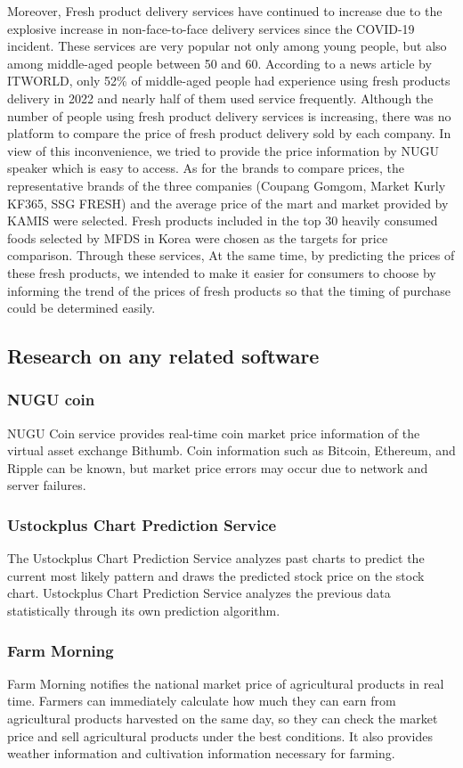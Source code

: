 \documentclass[conference]{IEEEtran}
\begin{document}
Moreover, Fresh product delivery services have continued to increase due to the explosive increase in non-face-to-face delivery services since the COVID-19 incident. These services are very popular not only among young people, but also among middle-aged people between 50 and 60. According to a news article by ITWORLD, only 52\% of middle-aged people had experience using fresh products delivery in 2022 and nearly half of them used service frequently. Although the number of people using fresh product delivery services is increasing, there was no platform to compare the price of fresh product delivery sold by each company. In view of this inconvenience, we tried to provide the price information by NUGU speaker which is easy to access. As for the brands to compare prices, the representative brands of the three companies (Coupang Gomgom, Market Kurly KF365, SSG FRESH) and the average price of the mart and market provided by KAMIS were selected. Fresh products included in the top 30 heavily consumed foods selected by MFDS in Korea were chosen as the targets for price comparison. Through these services, At the same time, by predicting the prices of these fresh products, we intended to make it easier for consumers to choose by informing the trend of the prices of fresh products so that the timing of purchase could be determined easily.




\subsection{Research on any related software}
\subsubsection{NUGU coin}

NUGU Coin service provides real-time coin market price information of the virtual asset exchange Bithumb. Coin information such as Bitcoin, Ethereum, and Ripple can be known, but market price errors may occur due to network and server failures.
\subsubsection{Ustockplus Chart Prediction Service}
The Ustockplus Chart Prediction Service analyzes past charts to predict the current most likely pattern and draws the predicted stock price on the stock chart. Ustockplus Chart Prediction Service analyzes the previous data statistically through its own prediction algorithm.
\subsubsection{Farm Morning}
Farm Morning notifies the national market price of agricultural products in real time. Farmers can immediately calculate how much they can earn from agricultural products harvested on the same day, so they can check the market price and sell agricultural products under the best conditions. It also provides weather information and cultivation information necessary for farming.\\
\end{document}
